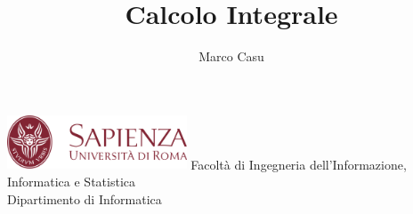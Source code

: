\documentclass[10pt, letterpaper]{report}
\title{Calcolo Integrale} %
\author{Marco Casu}
\date{\vspace{-5ex}}
\begin{document}
\begin{titlepage}
\begin{center}
    \HUGE \decothreeleft{}\hphantom{ }\decothreeright
\end{center}
\thispagestyle{empty}
\begin{figure}[h]
\end{figure}
\vfill 
\centering \includegraphics[width=0.4\textwidth ]{../../../../../preamble/Stemma_sapienza.png} \acc
\centering \Large \color{sapienza}Facoltà di Ingegneria dell'Informazione,
Informatica e Statistica\\
Dipartimento di Informatica
\end{titlepage}
\end{document}
